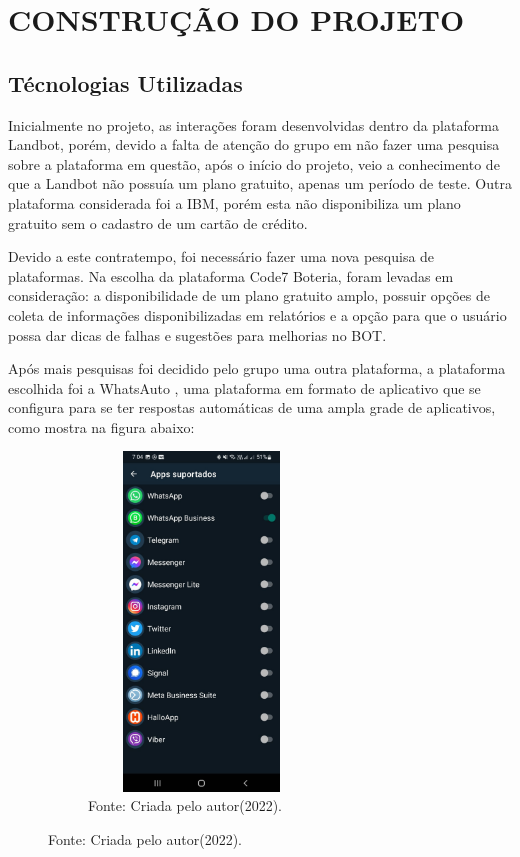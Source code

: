 \chapter{\uppercase{Construção do Projeto}}
\label{Construção do Projeto}

\section{Técnologias Utilizadas}

 Inicialmente no projeto, as interações foram desenvolvidas dentro da plataforma Landbot, porém, devido a falta de atenção do grupo em não fazer uma pesquisa sobre a plataforma em questão, após o início do projeto, veio a conhecimento de que a Landbot não possuía um plano gratuito, apenas um período de teste. Outra plataforma considerada foi a IBM, porém esta não disponibiliza um plano gratuito sem o cadastro de um cartão de crédito. \cite{ibm}
 
 Devido a este contratempo, foi necessário fazer uma nova pesquisa de plataformas. Na escolha da plataforma Code7 Boteria, foram levadas em consideração: a disponibilidade de um plano gratuito amplo, possuir opções de coleta de informações disponibilizadas em relatórios e a opção para que o usuário possa dar dicas de falhas e sugestões para melhorias no BOT.

 Após mais pesquisas foi decidido pelo grupo uma outra plataforma, a plataforma escolhida foi a WhatsAuto  \cite{whats}, uma plataforma em formato de aplicativo que se configura para se ter respostas automáticas de uma ampla grade de aplicativos, como mostra na figura abaixo:

\begin{figure}[!htb]
\centering
\captionsetup[subfigure]{labelformat=empty}
\caption{``Aplicativos Suportados''}
\begin{subfigure}{.5\textwidth}
\centering
\includegraphics[width=6cm,height=9cm]{Partes/Imagens/Apps Suportados.jpeg}
\caption{Fonte: Criada pelo autor(2022).}
\end{subfigure}%
\end{figure}

